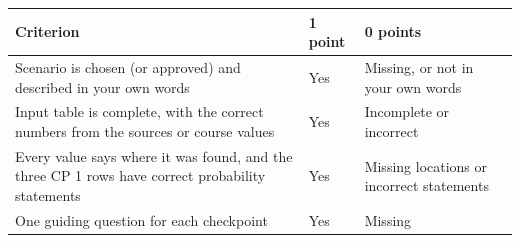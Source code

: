 \documentclass[
  letterpaper,
  DIV=11,
  numbers=noendperiod]{scrartcl}
\newcounter{none} %
\begin{document}
{\def\LTcaptype{none} %
\begin{longtable}[]{@{}
  >{\raggedright\arraybackslash}p{}
  >{\raggedright\arraybackslash}p{}
  >{\raggedright\arraybackslash}p{}@{}}
\toprule\noalign{}
\begin{minipage}[b]{\linewidth}\raggedright
Criterion
\end{minipage} & \begin{minipage}[b]{\linewidth}\raggedright
1 point
\end{minipage} & \begin{minipage}[b]{\linewidth}\raggedright
0 points
\end{minipage} \\
\midrule\noalign{}
\endhead
\bottomrule\noalign{}
\endlastfoot
Scenario is chosen (or approved) and described in your own words & Yes &
Missing, or not in your own words \\
Input table is complete, with the correct numbers from the sources or
course values & Yes & Incomplete or incorrect \\
Every value says where it was found, and the three CP 1 rows have
correct probability statements & Yes & Missing locations or incorrect
statements \\
One guiding question for each checkpoint & Yes & Missing \\
\end{longtable}
}
\end{document}
